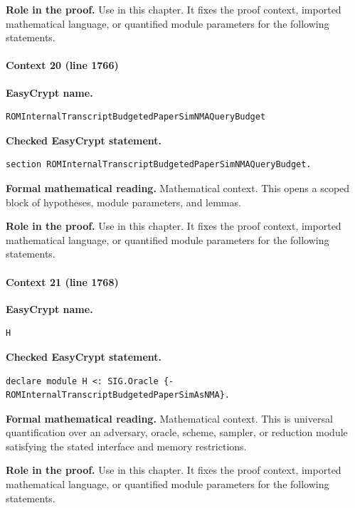 \noindent\textbf{Role in the proof.}
Use in this chapter. It fixes the proof context, imported mathematical language, or quantified module parameters for the following statements.

\paragraph{Context 20 (line 1766)}
\noindent\textbf{EasyCrypt name.}
\begin{lstlisting}[language=EasyCrypt,basicstyle=\ttfamily\scriptsize]
ROMInternalTranscriptBudgetedPaperSimNMAQueryBudget
\end{lstlisting}
\noindent\textbf{Checked EasyCrypt statement.}
\begin{lstlisting}[language=EasyCrypt,basicstyle=\ttfamily\scriptsize]
section ROMInternalTranscriptBudgetedPaperSimNMAQueryBudget.
\end{lstlisting}
\noindent\textbf{Formal mathematical reading.}
Mathematical context. This opens a scoped block of hypotheses, module parameters, and lemmas.

\noindent\textbf{Role in the proof.}
Use in this chapter. It fixes the proof context, imported mathematical language, or quantified module parameters for the following statements.

\paragraph{Context 21 (line 1768)}
\noindent\textbf{EasyCrypt name.}
\begin{lstlisting}[language=EasyCrypt,basicstyle=\ttfamily\scriptsize]
H
\end{lstlisting}
\noindent\textbf{Checked EasyCrypt statement.}
\begin{lstlisting}[language=EasyCrypt,basicstyle=\ttfamily\scriptsize]
declare module H <: SIG.Oracle {-ROMInternalTranscriptBudgetedPaperSimAsNMA}.
\end{lstlisting}
\noindent\textbf{Formal mathematical reading.}
Mathematical context. This is universal quantification over an adversary, oracle, scheme, sampler, or reduction module satisfying the stated interface and memory restrictions.

\noindent\textbf{Role in the proof.}
Use in this chapter. It fixes the proof context, imported mathematical language, or quantified module parameters for the following statements.

